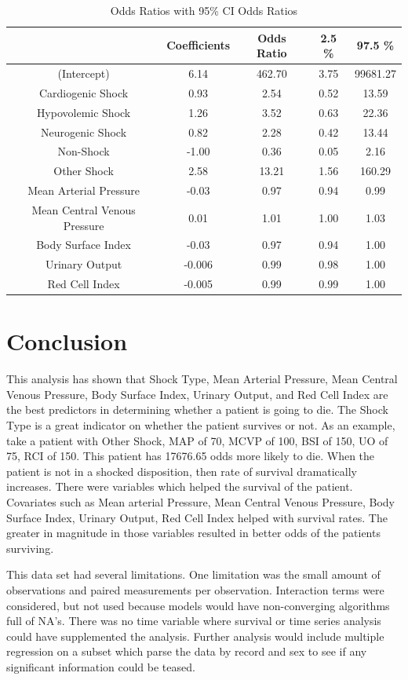 \documentclass{article}\usepackage[]{graphicx}\usepackage[]{color}
\begin{document}
\begin{table}[ht]
\centering
\caption{Odds Ratios with 95\% CI Odds Ratios}
\label{odds}
\begin{tabular}{ccccc}
  \hline
 &Coefficients&Odds Ratio & 2.5 \% & 97.5 \% \\ 
  \hline
(Intercept)&6.14& 462.70 & 3.75 & 99681.27 \\ 
  Cardiogenic Shock&0.93& 2.54 & 0.52 & 13.59 \\ 
  Hypovolemic Shock&1.26&3.52 & 0.63 & 22.36 \\ 
  Neurogenic Shock&0.82&2.28 & 0.42 & 13.44 \\ 
  Non-Shock&-1.00&0.36  & 0.05 & 2.16 \\ 
  Other Shock&2.58&13.21 & 1.56 & 160.29 \\ 
  Mean Arterial Pressure&-0.03&0.97 & 0.94 & 0.99 \\ 
  Mean Central Venous Pressure&0.01&1.01 & 1.00 & 1.03 \\ 
  Body Surface Index&-0.03&0.97 & 0.94 & 1.00 \\ 
  Urinary Output&-0.006&0.99 & 0.98 & 1.00 \\ 
  Red Cell Index&-0.005&0.99 & 0.99 & 1.00 \\ 
   \hline
\end{tabular}
\end{table}


\section{Conclusion}
\qquad This analysis has shown that Shock Type, Mean Arterial Pressure, Mean Central Venous Pressure, Body Surface Index, Urinary Output, and Red Cell Index are the best predictors in determining whether a patient is going to die. The Shock Type is a great indicator on whether the patient survives or not. As an example, take a patient with Other Shock, MAP of 70, MCVP of 100, BSI of 150, UO of 75, RCI of 150. This patient has 17676.65 odds more likely to die. When the patient is not in a shocked disposition, then rate of survival dramatically increases. There were variables which helped the survival of the patient. Covariates such as Mean arterial Pressure, Mean Central Venous Pressure, Body Surface Index, Urinary Output, Red Cell Index helped with survival rates. The greater in magnitude in those variables resulted in better odds of the patients surviving.

\qquad This data set had several limitations. One limitation was the small amount of observations and paired measurements per observation. Interaction terms were considered, but not used because models would have non-converging algorithms full of NA's. There was no time variable where survival or time series analysis could have supplemented the analysis. Further analysis would include multiple regression on a subset which parse the data by record and sex to see if any significant information could be teased. 
\end{document}
